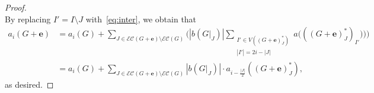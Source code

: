 \documentclass[10pt,a4paper]{amsart}
\newcommand{\EC}{\mathcal{E}\mathcal{C}}
\newcommand{\edge}{\mathbf{e}}
\begin{document}
\begin{proof}
$$    $$
    By replacing $I' =I \setminus J$ with~\eqref{eq:inter}, we obtain that
    \begin{align*}
      a_i(G+\edge) & = a_i(G) + \sum_{J \in \EC(G+\edge) \setminus \EC(G)}\Big( \left\vert b(G\vert_J) \right\vert \sum_{\substack{I' \in V((G+\edge)^\ast_J)\\ |I'| =2i-\left\vert J \right\vert}} a\big(((G+\edge)^\ast_J)_{I'})\big)\Big) \\
       & = a_i(G) + \sum_{J \in \EC(G+\edge) \setminus \EC(G)} \left\vert b(G \vert_J) \right\vert \cdot a_{i-\frac{|J|}{2}}((G +\edge)^\ast_J),
    \end{align*}
as desired.
\end{proof}
\end{document}
